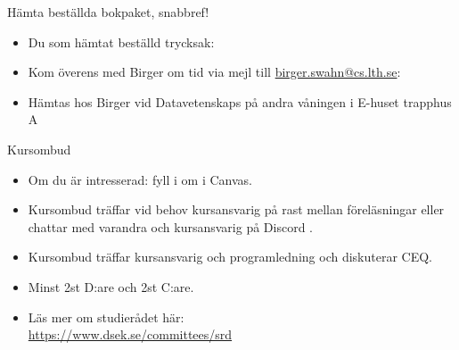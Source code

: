 
\ifkompendium\else
\begin{SlideExtra}{Hämta beställda bokpaket, snabbref!}
  \begin{itemize}
    \item Du som  hämtat beställd trycksak: 
    \item[] Kom överens med Birger om tid via mejl till \url{birger.swahn@cs.lth.se}: \\
    \item[] Hämtas hos Birger vid Datavetenskaps  på andra våningen i E-huset trapphus A
  \end{itemize}
\end{SlideExtra}


\begin{SlideExtra}{Kursombud}
\begin{itemize}
\item Om du är intresserad: fyll i  om  i Canvas.
\item Kursombud träffar vid behov kursansvarig på rast mellan föreläsningar eller chattar med varandra och kursansvarig på Discord .
\item Kursombud träffar kursansvarig och programledning  och diskuterar  CEQ.
\item Minst 2st D:are och 2st C:are.
\item Läs mer om studierådet här:\\{\SlideFontSmall\url{https://www.dsek.se/committees/srd}}
\end{itemize}
\end{SlideExtra}
\fi
